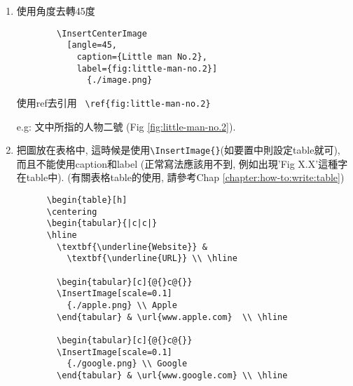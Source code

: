 \begin{enumerate}
{      之後可以使用ref去引用 \verb| \ref{fig:little-man-no.1} |

      e.g: 文中所指的人物一號 (Fig  \ref{fig:little-man-no.1}).
    } %

    \item
    {
      使用角度去轉45度
      \begin{verbatim}
        \InsertCenterImage
          [angle=45,
            caption={Little man No.2},
            label={fig:little-man-no.2}]
              {./image.png}
      \end{verbatim}

      使用ref去引用 \verb| \ref{fig:little-man-no.2} |

      e.g: 文中所指的人物二號 (Fig  \ref{fig:little-man-no.2}).
    } %

    \newpage
    \item
    {
      把圖放在表格中, 這時候是使用\verb|\InsertImage{}|(如要置中則設定table就可), 而且不能使用caption和label (正常寫法應該用不到, 例如出現'Fig X.X'這種字在table中). (有關表格table的使用, 請參考Chap \ref{chapter:how-to:write:table})

      \begin{verbatim}
      \begin{table}[h]
      \centering
      \begin{tabular}{|c|c|}
      \hline
        \textbf{\underline{Website}} &
          \textbf{\underline{URL}} \\ \hline

        \begin{tabular}[c]{@{}c@{}}
        \InsertImage[scale=0.1]
          {./apple.png} \\ Apple
        \end{tabular} & \url{www.apple.com}  \\ \hline

        \begin{tabular}[c]{@{}c@{}}
        \InsertImage[scale=0.1]
          {./google.png} \\ Google
        \end{tabular} & \url{www.google.com} \\ \hline


\end{verbatim}}
\end{enumerate}
